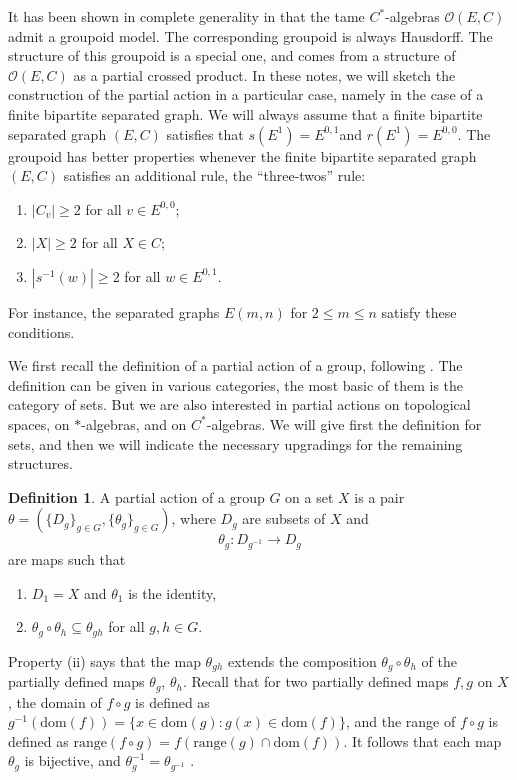 \documentclass[11pt]{amsart}
\theoremstyle{plain}            %
\theoremstyle{definition}       %
\newtheorem{definition}[theorem]{Definition}
\theoremstyle{definition}       %
\theoremstyle{remark}
\begin{document}
It has been shown in complete generality in \cite{abc25} that the tame $C^*$-algebras $\mathcal O (E,C)$ admit a groupoid model. The corresponding groupoid is always Hausdorff. The structure of this groupoid is a special one, and comes from a structure of $\mathcal O (E,C)$ as a partial crossed product. In these notes, we will sketch the construction of the partial action in a particular case, namely in the case of a finite bipartite separated graph. We will always assume that a finite bipartite separated graph $(E,C)$ satisfies that $s(E^1)=E^{0,1}$and $r(E^1)= E^{0,0}$. The groupoid has better properties whenever the finite bipartite separated graph $(E,C)$ satisfies an additional rule, the ``three-twos'' rule: 
\begin{enumerate}
\item[(TT1)] $|C_v| \geq 2$ for all $v \in E^{0,0}$; 
\item[(TT2)] $|X| \geq 2$ for all $X \in C$;
\item[(TT3)] $|s^{-1}(w)| \geq 2$ for all $w \in E^{0,1}$.
\end{enumerate}

For instance, the separated graphs $E(m,n)$ for $2\le m\le n$ satisfy these conditions. 

We first recall the definition of a partial action of a group, following \cite{ExelBook}.  The definition can be given in various categories, the most basic of them is the category of sets. But we are also interested in partial actions on topological spaces, on $*$-algebras, and on $C^*$-algebras. We will give first the definition for sets, and then we will indicate the necessary upgradings for the remaining structures.  

\begin{definition} {\rm \cite[Definition 2.1]{ExelBook}}
	A partial action of a group $G$ on a set $X$ is a pair $\theta = (\{D_g\}_{g\in G}, \{\theta_g \}_{g\in G})$, where $D_g$ are subsets of $X$ and 
	$$\theta_g \colon D_{g^{-1}} \to D_g$$
	are maps such that
	\begin{enumerate}
		\item[(i)] $D_1= X$ and $\theta_1$ is the identity,
		\item[(ii)] $\theta_g\circ \theta _h\subseteq \theta _{gh}$ for all $g,h\in G$. 
	\end{enumerate}
\end{definition}


Property (ii) says that the map $\theta_{gh}$ extends the composition $\theta_g\circ \theta_h$ of the partially defined maps $\theta_g$, $\theta_h$. Recall that for two partially defined maps $f,g$ on $X$, the domain of $f\circ g$ is defined as $g^{-1}(\text{dom} (f))= \{x\in \text{dom}(g) : g(x)\in \text{dom} (f)\}$, and the range of $f\circ g$ is defined as $\text{range} (f\circ g) = f(\text{range} (g)\cap \text{dom}(f))$. It follows that each map $\theta_g$ is bijective, and $\theta_g^{-1} = \theta_{g^{-1}}$
\cite[Proposition 2.4]{ExelBook}. 
\end{document}
